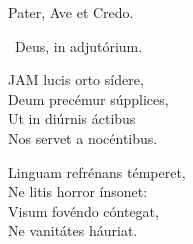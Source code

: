 
Pater, Ave et Credo.

\V\ Deus, in adjutórium.


\lettrine[lines=2]{J}{AM} lucis orto sídere,\\
Deum precémur súpplices,\\
Ut in diúrnis áctibus\\
Nos servet a nocéntibus.

Linguam refrénans témperet,\\
Ne litis horror ínsonet:\\
Visum fovéndo cóntegat,\\
Ne vanitátes háuriat.

